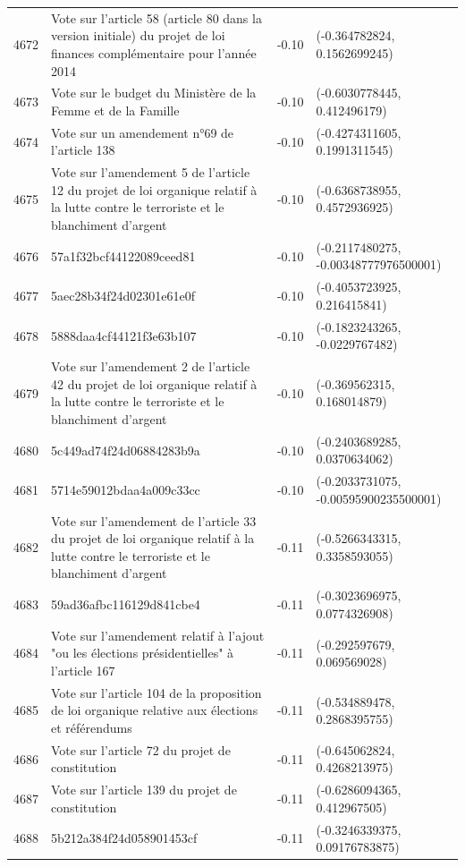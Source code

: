 \begin{table}[ht]
\begin{tabular}{rlrl}
  4672 & Vote sur l'article 58 (article 80 dans la version initiale) du projet de loi finances complémentaire pour l'année 2014 & -0.10 & (-0.364782824, 0.1562699245) \\ 
  4673 & Vote sur le budget du Ministère de la Femme et de la Famille & -0.10 & (-0.6030778445, 0.412496179) \\ 
  4674 & Vote sur un amendement n°69 de l'article 138 & -0.10 & (-0.4274311605, 0.1991311545) \\ 
  4675 & Vote sur l'amendement 5 de l'article 12 du projet de loi organique relatif à la lutte contre le terroriste et le blanchiment d'argent & -0.10 & (-0.6368738955, 0.4572936925) \\ 
  4676 & 57a1f32bcf44122089ceed81 & -0.10 & (-0.2117480275, -0.00348777976500001) \\ 
  4677 & 5aec28b34f24d02301e61e0f & -0.10 & (-0.4053723925, 0.216415841) \\ 
  4678 & 5888daa4cf44121f3e63b107 & -0.10 & (-0.1823243265, -0.0229767482) \\ 
  4679 & Vote sur l'amendement 2 de l'article 42 du projet de loi organique relatif à la lutte contre le terroriste et le blanchiment d'argent & -0.10 & (-0.369562315, 0.168014879) \\ 
  4680 & 5c449ad74f24d06884283b9a & -0.10 & (-0.2403689285, 0.0370634062) \\ 
  4681 & 5714e59012bdaa4a009c33cc & -0.10 & (-0.2033731075, -0.00595900235500001) \\ 
  4682 & Vote sur l'amendement de l'article 33 du projet de loi organique relatif à la lutte contre le terroriste et le blanchiment d'argent & -0.11 & (-0.5266343315, 0.3358593055) \\ 
  4683 & 59ad36afbc116129d841cbe4 & -0.11 & (-0.3023696975, 0.0774326908) \\ 
  4684 & Vote sur l'amendement relatif à l'ajout "ou les élections présidentielles" à l'article 167 & -0.11 & (-0.292597679, 0.069569028) \\ 
  4685 & Vote sur l'article 104 de la proposition de loi organique relative aux élections et référendums & -0.11 & (-0.534889478, 0.2868395755) \\ 
  4686 & Vote sur l'article 72 du projet de constitution & -0.11 & (-0.645062824, 0.4268213975) \\ 
  4687 & Vote sur l'article 139 du projet de constitution & -0.11 & (-0.6286094365, 0.412967505) \\ 
  4688 & 5b212a384f24d058901453cf & -0.11 & (-0.3246339375, 0.09176783875) \\ 

\end{tabular}
\end{table}
